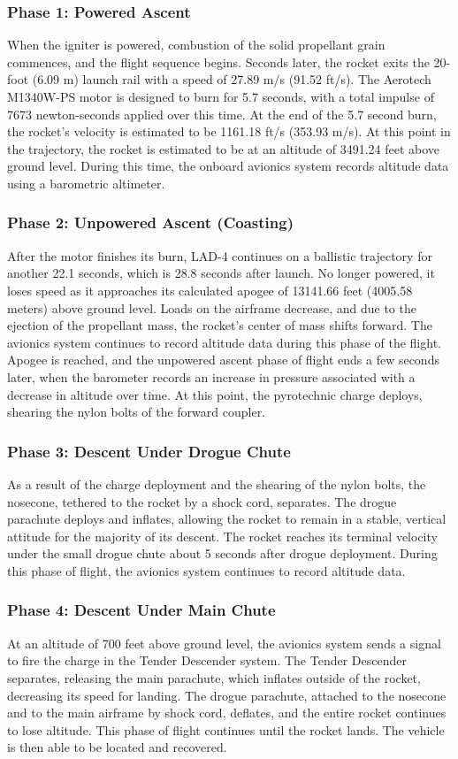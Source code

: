 \subsubsection*{Phase 1: Powered Ascent}
When the igniter is powered, combustion of the solid propellant grain commences, and the flight sequence begins. Seconds later, the rocket exits the 20-foot (6.09 m) launch rail with a speed of 27.89 m/s (91.52 ft/s). The Aerotech M1340W-PS motor is designed to burn for 5.7 seconds, with a total impulse of 7673 newton-seconds applied over this time. At the end of the 5.7 second burn, the rocket’s velocity is estimated to be 1161.18 ft/s (353.93 m/s). At this point in the trajectory, the rocket is estimated to be at an altitude of 3491.24 feet above ground level. During this time, the onboard avionics system records altitude data using a barometric altimeter. 
\subsubsection*{Phase 2: Unpowered Ascent (Coasting)}
After the motor finishes its burn, LAD-4 continues on a ballistic trajectory for another 22.1 seconds, which is 28.8 seconds after launch. No longer powered, it loses speed as it approaches its calculated apogee of 13141.66 feet (4005.58 meters) above ground level. Loads on the airframe decrease, and due to the ejection of the propellant mass, the rocket’s center of mass shifts forward. The avionics system continues to record altitude data during this phase of the flight. Apogee is reached, and the unpowered ascent phase of flight ends a few seconds later, when the barometer records an increase in pressure associated with a decrease in altitude over time. At this point, the pyrotechnic charge deploys, shearing the nylon bolts of the forward coupler.
\subsubsection*{Phase 3: Descent Under Drogue Chute}
As a result of the charge deployment and the shearing of the nylon bolts, the nosecone, tethered to the rocket by a shock cord, separates. The drogue parachute deploys and inflates, allowing the rocket to remain in a stable, vertical attitude for the majority of its descent. The rocket reaches its terminal velocity under the small drogue chute about 5 seconds after drogue deployment. During this phase of flight, the avionics system continues to record altitude data.
\subsubsection*{Phase 4: Descent Under Main Chute}
At an altitude of 700 feet above ground level, the avionics system sends a signal to fire the charge in the Tender Descender system. The Tender Descender separates, releasing the main parachute, which inflates outside of the rocket, decreasing its speed for landing. The drogue parachute, attached to the nosecone and to the main airframe by shock cord, deflates, and the entire rocket continues to lose altitude. This phase of flight continues until the rocket lands. The vehicle is then able to be located and recovered.
